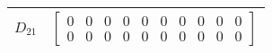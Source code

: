 \begin{tabular}{cl}
 $D_{21}$ & $\left[\begin{matrix}0 & 0 & 0 & 0 & 0 & 0 & 0 & 0 & 0 & 0\\0 & 0 & 0 & 0 & 0 & 0 & 0 & 0 & 0 & 0\end{matrix}\right]$                                                                                                                                                                                                                                                                                                                                                                                                                                                                                                                                                                                                                                                                                                         \\
\hline
\end{tabular}